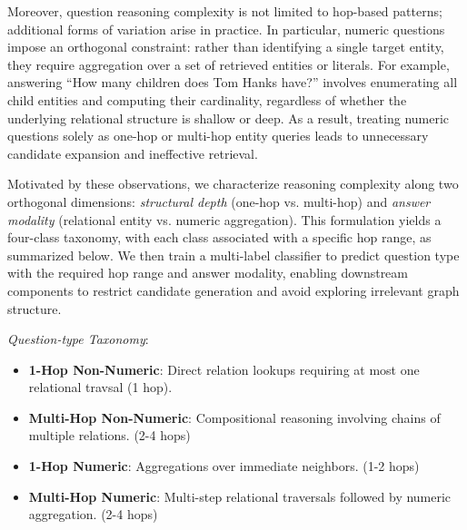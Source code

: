 \documentclass[conference]{IEEEtran}
\begin{document}
Moreover, question reasoning complexity is not limited to hop-based patterns; additional forms of variation arise in practice. In particular, numeric questions impose an orthogonal constraint: rather than identifying a single target entity, they require aggregation over a set of retrieved entities or literals. For example, answering “How many children does Tom Hanks have?” involves enumerating all child entities and computing their cardinality, regardless of whether the underlying relational structure is shallow or deep. As a result, treating numeric questions solely as one-hop or multi-hop entity queries leads to unnecessary candidate expansion and ineffective retrieval.

Motivated by these observations, we characterize reasoning complexity along two orthogonal dimensions: \textit{structural depth} (one-hop vs. multi-hop) and \textit{answer modality} (relational entity vs. numeric aggregation). This formulation yields a four-class taxonomy, with each class associated with a specific hop range, as summarized below. We then train a multi-label classifier to predict question type with the required hop range and answer modality, enabling downstream components to restrict candidate generation and avoid exploring irrelevant graph structure.

\noindent \textit{Question-type Taxonomy}: 
\begin{itemize}
    \item \textbf{1-Hop Non-Numeric}: Direct relation lookups requiring at most one relational travsal (1 hop).
    \item \textbf{Multi-Hop Non-Numeric}: Compositional reasoning involving chains of multiple relations. (2-4 hops)
    \item \textbf{1-Hop Numeric}: Aggregations over immediate neighbors. (1-2 hops)
    \item \textbf{Multi-Hop Numeric}: Multi-step relational traversals followed by numeric aggregation. (2-4 hops)
\end{itemize}
\end{document}

